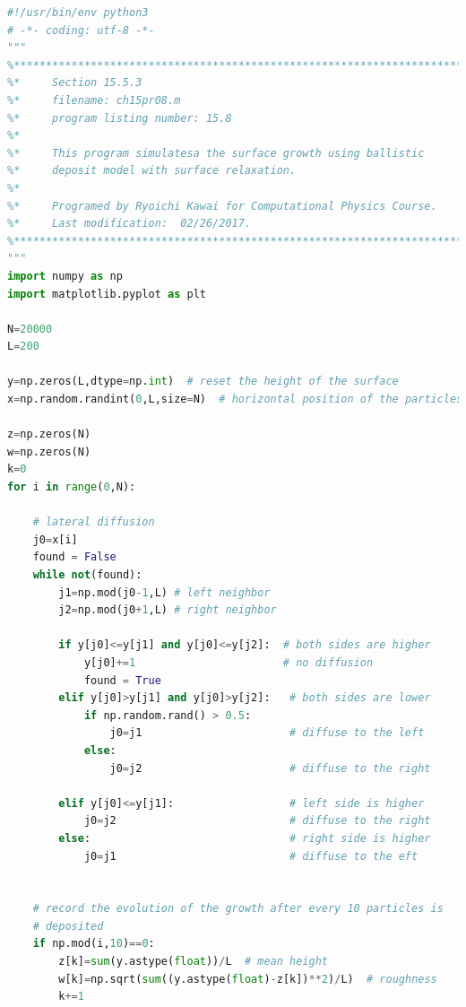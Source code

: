 \bigskip
\noindent
\program
\footnotesize
\begin{lstlisting}[language=python]
#!/usr/bin/env python3
# -*- coding: utf-8 -*-
"""
%**************************************************************************
%*     Section 15.5.3                                                     *
%*     filename: ch15pr08.m                                               *
%*     program listing number: 15.8                                       *
%*                                                                        *
%*     This program simulatesa the surface growth using ballistic         *
%*     deposit model with surface relaxation.                             *
%*                                                                        *
%*     Programed by Ryoichi Kawai for Computational Physics Course.       *
%*     Last modification:  02/26/2017.                                    *
%**************************************************************************
"""
import numpy as np
import matplotlib.pyplot as plt

N=20000
L=200

y=np.zeros(L,dtype=np.int)  # reset the height of the surface
x=np.random.randint(0,L,size=N)  # horizontal position of the particles

z=np.zeros(N)
w=np.zeros(N)
k=0
for i in range(0,N):
    
    # lateral diffusion
    j0=x[i]
    found = False
    while not(found):
        j1=np.mod(j0-1,L) # left neighbor
        j2=np.mod(j0+1,L) # right neighbor
        
        if y[j0]<=y[j1] and y[j0]<=y[j2]:  # both sides are higher
            y[j0]+=1                       # no diffusion
            found = True
        elif y[j0]>y[j1] and y[j0]>y[j2]:   # both sides are lower
            if np.random.rand() > 0.5:
                j0=j1                       # diffuse to the left
            else:
                j0=j2                       # diffuse to the right

        elif y[j0]<=y[j1]:                  # left side is higher
            j0=j2                           # diffuse to the right
        else:                               # right side is higher
            j0=j1                           # diffuse to the eft

    
    # record the evolution of the growth after every 10 particles is
    # deposited    
    if np.mod(i,10)==0:
        z[k]=sum(y.astype(float))/L  # mean height
        w[k]=np.sqrt(sum((y.astype(float)-z[k])**2)/L)  # roughness
        k+=1


\end{lstlisting}
